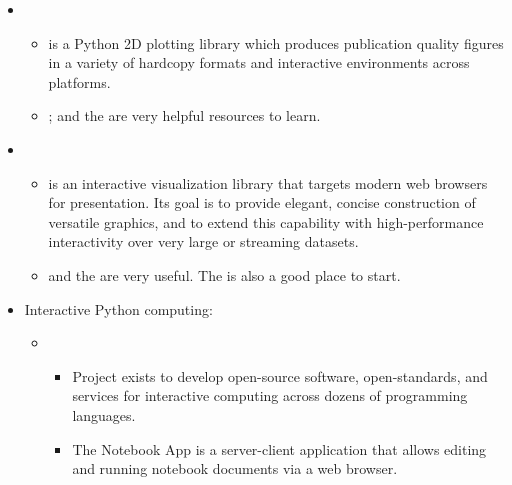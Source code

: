\documentclass[letterpaper,10pt,english]{sphinxmanual}
\begin{document}
\begin{itemize}
\begin{itemize}
\end{itemize}

\item {} 
\begin{itemize}
\item {} 
 is a Python 2D plotting library which produces
publication quality figures in a variety of hardcopy formats and
interactive environments across platforms.

\item {} 
; and the
are very helpful resources to learn.

\end{itemize}

\item {} 
\begin{itemize}
\item {} 
 is an interactive visualization library that targets
modern web browsers for presentation. Its goal is to provide
elegant, concise construction of versatile graphics, and to extend
this capability with high-performance interactivity over very
large or streaming datasets.

\item {} 
and the 
are very useful. The 
is also a good place to start.

\end{itemize}

\item {} 
Interactive Python computing:
\begin{itemize}
\item {} 
\begin{itemize}
\item {} 
Project  exists to develop open-source software,
open-standards, and services for interactive computing across
dozens of programming languages.

\item {} 
The  Notebook App is a server-client application
that allows editing and running notebook documents via a web
browser.


\end{itemize}
\end{itemize}
\end{itemize}
\end{document}
